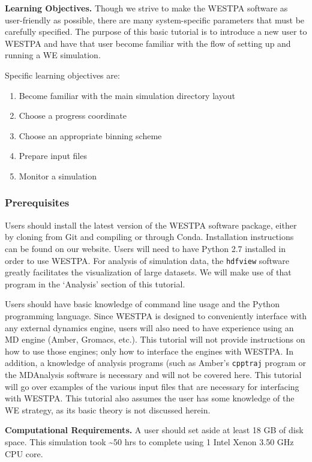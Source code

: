 \documentclass[9pt,tutorial,ASAPversion]{livecoms}
\begin{document}
\textbf{Learning Objectives.} Though we strive to make the WESTPA software as user-friendly as possible, there are many system-specific parameters that must be carefully specified. 
The purpose of this basic tutorial is to introduce a new user to WESTPA and have that user become familiar with the flow of setting up and running a WE simulation.   

Specific learning objectives are:
\begin{enumerate}
\item Become familiar with the main simulation directory layout
\item Choose a progress coordinate
\item Choose an appropriate binning scheme
\item Prepare input files
\item Monitor a simulation
\end{enumerate}

\subsubsection{Prerequisites}

Users should install the latest version of the WESTPA software package, either by cloning from Git and compiling or through Conda. 
Installation instructions can be found on our website. 
Users will need to have Python 2.7 installed in order to use WESTPA. 
For analysis of simulation data, the \verb|hdfview| software greatly facilitates the visualization of large datasets. 
We will make use of that program in the ‘Analysis’ section of this tutorial.

Users should have basic knowledge of command line usage and the Python programming language. 
Since WESTPA is designed to conveniently interface with any external dynamics engine, users will also need to have experience using an MD engine (Amber, Gromacs, etc.). 
This tutorial will not provide instructions on how to use those engines; only how to interface the engines with WESTPA. 
In addition, a knowledge of analysis programs (such as Amber’s \verb|cpptraj| program or the MDAnalysis software is necessary and will not be covered here. 
This tutorial will go over examples of the various input files that are necessary for interfacing with WESTPA. 
This tutorial also assumes the user has some knowledge of the WE strategy, as its basic theory is not discussed herein.

\textbf{Computational Requirements.} A user should set aside at least 18 GB of disk space. 
This simulation took \textasciitilde 50 hrs to complete using 1 Intel Xenon 3.50 GHz CPU core.
\end{document}
